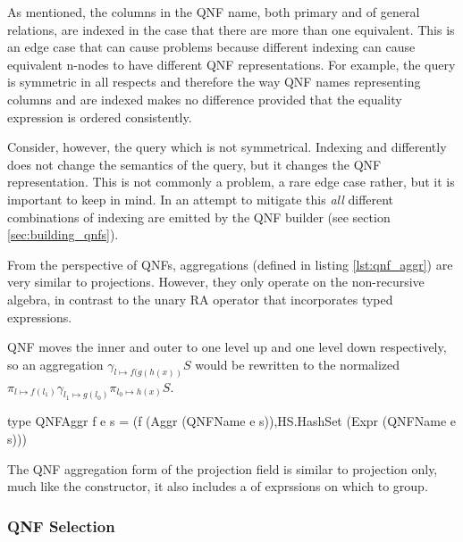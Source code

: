 As mentioned, the columns in the QNF name, both primary and of general
relations, are indexed in the case that there are more than one
equivalent. This is an edge case that can cause problems because
different indexing can cause equivalent n-nodes to have different QNF
representations. For example, the query  is symmetric in all respects and therefore
the way QNF names representing columns  and  are
indexed makes no difference provided that the equality expression
 is ordered consistently.


Consider, however, the query  which is not symmetrical. Indexing  and
 differently does not change the semantics of the query, but
it changes the QNF representation. This is not commonly a problem, a
rare edge case rather, but it is important to keep in mind.  In an
attempt to mitigate this \emph{all} different combinations of indexing
are emitted by the QNF builder (see section \ref{sec:building_qnfs}).

From the perspective of QNFs, aggregations (defined in listing
\ref{lst:qnf_aggr}) are very similar to projections. However, they
only operate on the non-recursive  algebra, in contrast to
the  unary RA operator that incorporates  typed expressions.

QNF moves the inner and outer  to one level up and one
level down respectively, so an aggregation \(\gamma_{l \mapsto
f(g(h(x))} S\) would be rewritten to the normalized \(\pi_{l \mapsto
f(l_1)} \gamma_{l_1 \mapsto g(l_0)} \pi_{l_0 \mapsto h(x)} S\).

\begin{code}
  \begin{haskellcode}
    type QNFAggr f e s =
    (f (Aggr (QNFName e s)),HS.HashSet (Expr (QNFName e s)))
  \end{haskellcode}
  \caption{\label{lst:qnf_aggr} The QNF aggregation form of the
    projection field is similar to projection only, much like the
     constructor, it also includes a  of
    exprssions on which to group.}
\end{code}

\subsubsection{QNF Selection}

